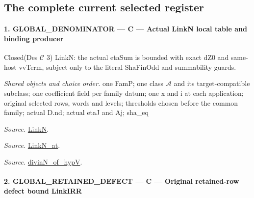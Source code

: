 \subsection{The complete current selected register}

\paragraph{1. GLOBAL\_\allowbreak DENOMINATOR — C — Actual LinkN local table and binding producer}

Closed(Des $\mathcal C$ 3) LinkN: the actual etaSum is bounded with exact dZ0 and same-host vvTerm, subject only to the literal ShaFinOdd and summability guards.

\emph{Shared objects and choice order.} one FamP; one class $\mathcal A$ and its target-compatible subclass; one coefficient field per family datum; one x and i at each application; original selected rows, words and levels; thresholds chosen before the common family; actual D.nd; actual etaJ and Aj; sha\_\allowbreak eq

\emph{Source.} \href{https://github.com/CocoSgt/riemann-hypothesis-lean/blob/7cbf7a0c32fca1badf05931879a37c3f8a2b03b4/src/Formalism/SharpRestriction/GlobalTheoremInputs.lean#L45-L48}{LinkN}.

\emph{Source.} \href{https://github.com/CocoSgt/riemann-hypothesis-lean/blob/7cbf7a0c32fca1badf05931879a37c3f8a2b03b4/src/Formalism/SharpRestriction/GlobalTheoremInputs.lean#L40-L44}{LinkN\_\allowbreak at}.

\emph{Source.} \href{https://github.com/CocoSgt/riemann-hypothesis-lean/blob/7cbf7a0c32fca1badf05931879a37c3f8a2b03b4/src/Development/AutomorphicArithmetic/CharacterBoxes/DivinNOfHypV.lean#L117-L134}{divinN\_\allowbreak of\_\allowbreak hypV}.



\paragraph{2. GLOBAL\_\allowbreak RETAINED\_\allowbreak DEFECT — C — Original retained-row defect bound LinkIRR}

